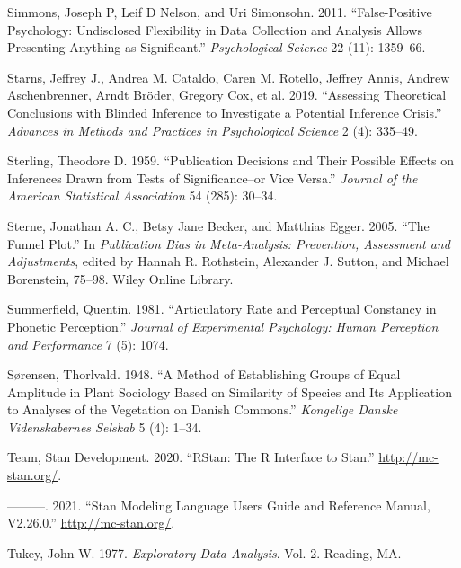 \documentclass[
  12pt,
]{article}
\newlength{\cslhangindent}
\newenvironment{CSLReferences}[2] %
 {%
  \setlength{\parindent}{0pt}
  \ifodd #1 \everypar{\setlength{\hangindent}{\cslhangindent}}\ignorespaces\fi
  \ifnum #2 > 0
  \setlength{\parskip}{#2\baselineskip}
  \fi
 }%
 {}
\begin{document}
\begin{CSLReferences}{1}{0}
\leavevmode{}%
Simmons, Joseph P, Leif D Nelson, and Uri Simonsohn. 2011. {``False-Positive Psychology: Undisclosed Flexibility in Data Collection and Analysis Allows Presenting Anything as Significant.''} \emph{Psychological Science} 22 (11): 1359--66.

\leavevmode{}%
Starns, Jeffrey J., Andrea M. Cataldo, Caren M. Rotello, Jeffrey Annis, Andrew Aschenbrenner, Arndt Bröder, Gregory Cox, et al. 2019. {``Assessing Theoretical Conclusions with Blinded Inference to Investigate a Potential Inference Crisis.''} \emph{Advances in Methods and Practices in Psychological Science} 2 (4): 335--49.

\leavevmode{}%
Sterling, Theodore D. 1959. {``Publication Decisions and Their Possible Effects on Inferences Drawn from Tests of Significance--or Vice Versa.''} \emph{Journal of the American Statistical Association} 54 (285): 30--34.

\leavevmode{}%
Sterne, Jonathan A. C., Betsy Jane Becker, and Matthias Egger. 2005. {``The Funnel Plot.''} In \emph{Publication Bias in Meta-Analysis: Prevention, Assessment and Adjustments}, edited by Hannah R. Rothstein, Alexander J. Sutton, and Michael Borenstein, 75--98. Wiley Online Library.

\leavevmode{}%
Summerfield, Quentin. 1981. {``Articulatory Rate and Perceptual Constancy in Phonetic Perception.''} \emph{Journal of Experimental Psychology: Human Perception and Performance} 7 (5): 1074.

\leavevmode{}%
Sørensen, Thorlvald. 1948. {``A Method of Establishing Groups of Equal Amplitude in Plant Sociology Based on Similarity of Species and Its Application to Analyses of the Vegetation on {D}anish Commons.''} \emph{Kongelige Danske Videnskabernes Selskab} 5 (4): 1--34.

\leavevmode{}%
Team, Stan Development. 2020. {``{RStan}: The {R} Interface to {Stan}.''} \url{http://mc-stan.org/}.

\leavevmode{}%
---------. 2021. {``Stan Modeling Language Users Guide and Reference Manual, V2.26.0.''} \url{http://mc-stan.org/}.

\leavevmode{}%
Tukey, John W. 1977. \emph{Exploratory Data Analysis}. Vol. 2. Reading, MA.


\end{CSLReferences}
\end{document}
